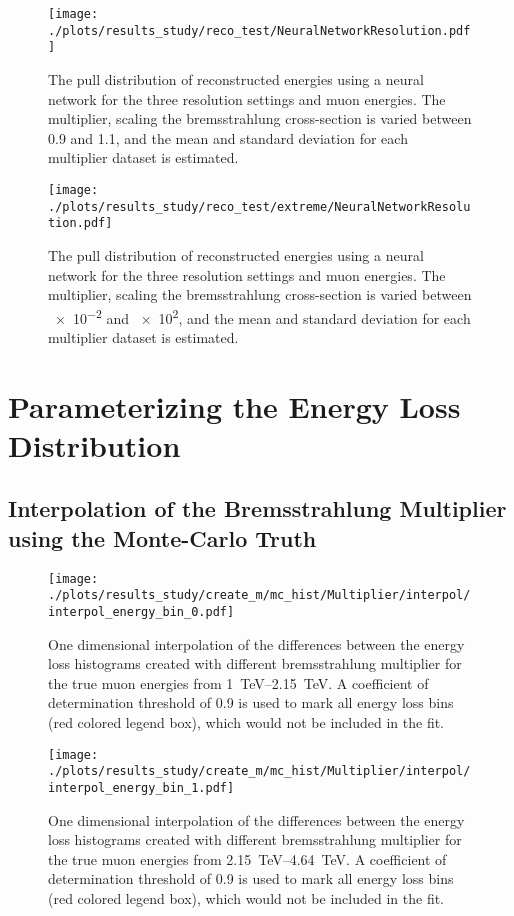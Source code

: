 \begin{figure}[H]
    \centering
    \texttt{[image: ./plots/results\_study/reco\_test/NeuralNetworkResolution.pdf]}
    \caption{The pull distribution of reconstructed energies using a neural network for the three resolution settings and muon energies. The multiplier, scaling the bremsstrahlung cross-section is varied between \num{0.9} and \num{1.1}, and the mean and standard deviation for each multiplier dataset is estimated.}
    \label{fig:study_ereco_pull_nn}
\end{figure}

\begin{figure}[H]
    \centering
    \texttt{[image: ./plots/results\_study/reco\_test/extreme/NeuralNetworkResolution.pdf]}
    \caption{The pull distribution of reconstructed energies using a neural network for the three resolution settings and muon energies. The multiplier, scaling the bremsstrahlung cross-section is varied between \num{e-2} and \num{e2}, and the mean and standard deviation for each multiplier dataset is estimated.}
    \label{fig:study_ereco_pull_nn_extreme}
\end{figure}

%

\section{Parameterizing the Energy Loss Distribution} \label{sec:study_append_interpol}

\subsection*{Interpolation of the Bremsstrahlung Multiplier using the Monte-Carlo Truth}

\begin{figure}[H]
    \centering
    \texttt{[image: ./plots/results\_study/create\_m/mc\_hist/Multiplier/interpol/interpol\_energy\_bin\_0.pdf]}
    \caption{One dimensional interpolation of the differences between the energy loss histograms created with different bremsstrahlung multiplier for the true muon energies from \SIrange{1}{2.15}{TeV}. A coefficient of determination threshold of \num{0.9} is used to mark all energy loss bins (red colored legend box), which would not be included in the fit.}
    \label{fig:study_1d_interpol_mu0_mc}
\end{figure}

\begin{figure}[H]
    \centering
    \texttt{[image: ./plots/results\_study/create\_m/mc\_hist/Multiplier/interpol/interpol\_energy\_bin\_1.pdf]}
    \caption{One dimensional interpolation of the differences between the energy loss histograms created with different bremsstrahlung multiplier for the true muon energies from \SIrange{2.15}{4.64}{TeV}. A coefficient of determination threshold of \num{0.9} is used to mark all energy loss bins (red colored legend box), which would not be included in the fit.}
    \label{fig:study_1d_interpol_mu1_mc}
\end{figure}

